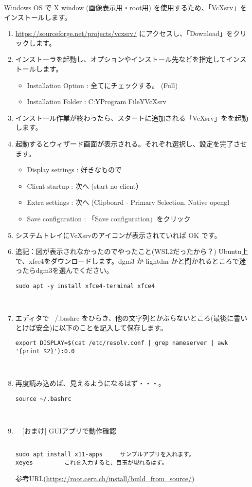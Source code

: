 Windows OS で X window (画像表示用・root用) を使用するため、「VcXsrv」をインストールします。
\begin{enumerate}
  \item \url{https://sourceforge.net/projects/vcxsrv/} にアクセスし、「Download」をクリックします。
  \item インストーラを起動し、オプションやインストール先などを指定してインストールします。
        \begin{itemize}
          \item Installation Option : 全てにチェックする。 (Full)
          \item Installation Folder : C:¥Program File¥VcXsrv
        \end{itemize}
  \item インストール作業が終わったら、スタートに追加される「VcXsrv」をを起動します。
  \item 起動するとウィザード画面が表示される。それぞれ選択し、設定を完了させます。
        \begin{itemize}
          \item Display settings : 好きなもので
          \item Client startup : 次へ (start no client）
          \item Extra settings : 次へ (Clipboard - Primary Selection, Native opengl
          \item Save configuration : 「Save configuration」をクリック
        \end{itemize}
  \item システムトレイにVcXsrvのアイコンが表示されていれば OK です。

  \item 追記：図が表示されなかったのでやったこと(WSL2だったから？) Ubuntu上で、xfce4をダウンロードします。dgm3 か lightdm かと聞かれるところで迷ったらdgm3を選んでください。
\begin{lstlisting}
sudo apt -y install xfce4-terminal xfce4
\end{lstlisting}
　\item エディタで ~/.bashrc をひらき、他の文字列とかぶらないところ(最後に書いとけば安全)に以下のことを記入して保存します。
\begin{lstlisting}
export DISPLAY=$(cat /etc/resolv.conf | grep nameserver | awk '{print $2}'):0.0
\end{lstlisting}
　\item 再度読み込めば、見えるようになるはず・・・。
\begin{lstlisting}
source ~/.bashrc
\end{lstlisting}
　\item　[おまけ] GUIアプリで動作確認
\begin{lstlisting}　　　　
sudo apt install x11-apps     サンプルアプリを入れます。
xeyes         これを入力すると、目玉が現れるはず。
\end{lstlisting}

参考URL(\url{https://root.cern.ch/install/build_from_source/})
\end{enumerate}


